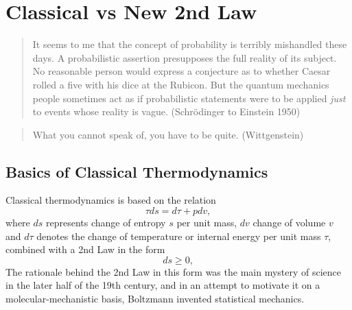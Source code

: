\iffalse  %
\chapter{Classical vs New 2nd Law}

\small


\begin{quote}
It seems to me that the concept of probability
is terribly mishandled these days. A probabilistic assertion presupposes
the full reality of its subject. No reasonable person would express
a conjecture as to whether Caesar rolled a five with his dice at the
Rubicon. But the quantum mechanics people sometimes act as if 
probabilistic statements were to be applied \emph{just} to
events whose reality is vague. (Schr\"odinger to Einstein 1950)
\end{quote} 

\begin{quote}  What you cannot speak of, 
you have to be quite. (Wittgenstein) 
\end{quote}

\normalsize

\section{Basics of Classical Thermodynamics}

Classical thermodynamics is based on the relation 
\begin{equation}\label{2ndlawclass}
\tau ds=d\tau +pdv, 
\end{equation}
where $ds$ represents change of entropy $s$ per unit mass, $dv$ change
of volume $v$ and $d\tau $ denotes the change of temperature
or internal energy per unit mass $\tau$, 
combined with a 2nd Law in the form
\begin{equation}\label{classentropy}
ds\ge 0,
\end{equation}
The rationale behind the 2nd Law in this form was the main mystery
of science in the later half of the 19th century, and in an attempt
to motivate it on a molecular-mechanistic basis, Boltzmann
invented statistical mechanics.

